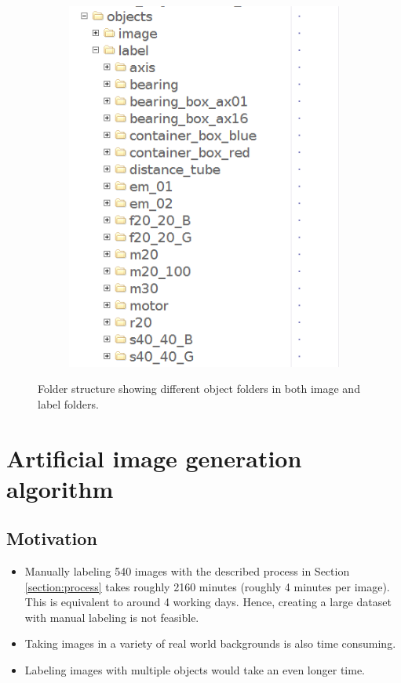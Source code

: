 \begin{center}
\begin{figure}
\begin{subfigure}{.5\textwidth}
			\includegraphics[width=1\linewidth]{images/folder_label}
			\label{Fig:fsilb}
		\end{subfigure}
		\caption{Folder structure showing different object folders in both image and label folders.}
		\label{Fig:fsil}
	\end{figure}
\end{center}

\section{Artificial image generation algorithm}

\subsection{Motivation}
	\begin{itemize}
		\item Manually labeling 540 images with the described process in Section \ref{section:process} takes roughly 2160 minutes (roughly 4 minutes per image). This is equivalent to around 4 working days. Hence, creating a large dataset with manual labeling is not feasible.
		\item Taking images in a variety of real world backgrounds is also time consuming.
		\item Labeling images with multiple objects would take an even longer time.
	\end{itemize}
	
